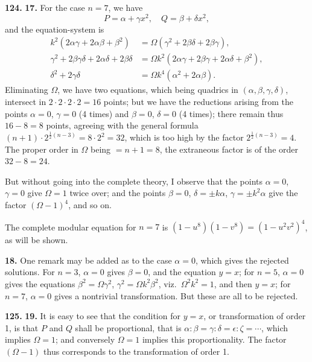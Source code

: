\documentclass[11pt,a4paper]{book}
\begin{document}
\noindent\textbf{124.} \textbf{17.} For the case $n = 7$, we have
\[
P = \alpha + \gamma x^2, \quad Q = \beta + \delta x^2,
\]
and the equation-system is
\begin{align*}
k^2(2\alpha\gamma + 2\alpha\beta + \beta^2) &= \Omega(\gamma^2 + 2\beta\delta + 2\beta\gamma), \\
\gamma^2 + 2\beta\gamma\delta + 2\alpha\delta + 2\beta\delta &= \Omega k^2(2\alpha\gamma + 2\beta\gamma + 2\alpha\delta + \beta^2), \\
\delta^2 + 2\gamma\delta &= \Omega k^4(\alpha^2 + 2\alpha\beta).
\end{align*}
Eliminating $\Omega$, we have two equations, which being quadrics in $(\alpha, \beta, \gamma, \delta)$, intersect in $2 \cdot 2 \cdot 2 \cdot 2 = 16$ points; but we have the reductions arising from the points $\alpha = 0$, $\gamma = 0$ (4 times) and $\beta = 0$, $\delta = 0$ (4 times); there remain thus $16 - 8 = 8$ points, agreeing with the general formula $(n + 1) \cdot 2^{\frac{1}{2}(n-3)} = 8 \cdot 2^2 = 32$, which is too high by the factor $2^{\frac{1}{2}(n-3)} = 4$. The proper order in $\Omega$ being $= n + 1 = 8$, the extraneous factor is of the order $32 - 8 = 24$.

But without going into the complete theory, I observe that the points $\alpha = 0$, $\gamma = 0$ give $\Omega = 1$ twice over; and the points $\beta = 0$, $\delta = \pm k\alpha$, $\gamma = \pm k^2\alpha$ give the factor $(\Omega - 1)^4$, and so on.

The complete modular equation for $n = 7$ is $(1 - u^8)(1 - v^8) = (1 - u^2v^2)^4$, as will be shown.

\medskip
\noindent\textbf{18.} One remark may be added as to the case $\alpha = 0$, which gives the rejected solutions. For $n = 3$, $\alpha = 0$ gives $\beta = 0$, and the equation $y = x$; for $n = 5$, $\alpha = 0$ gives the equations $\beta^2 = \Omega\gamma^2$, $\gamma^2 = \Omega k^2\beta^2$, viz.\ $\Omega^2k^2 = 1$, and then $y = x$; for $n = 7$, $\alpha = 0$ gives a nontrivial transformation. But these are all to be rejected.


\noindent\textbf{125.} \textbf{19.} It is easy to see that the condition for $y = x$, or transformation of order 1, is that $P$ and $Q$ shall be proportional, that is $\alpha : \beta = \gamma : \delta = \epsilon : \zeta = \cdots$, which implies $\Omega = 1$; and conversely $\Omega = 1$ implies this proportionality. The factor $(\Omega - 1)$ thus corresponds to the transformation of order 1.
\end{document}

